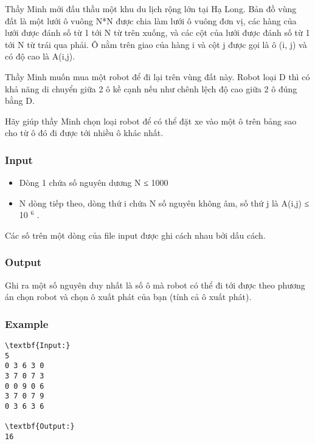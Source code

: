 



   Thầy Minh mới đấu thầu một khu du lịch rộng lớn tại Hạ Long. Bản đồ vùng đất là một lưới ô vuông N*N được chia làm lưới ô vuông đơn vị, các hàng của lưới được đánh số từ 1 tới N từ trên xuống, và các cột của lưới được đánh số từ 1 tới N từ trái qua phải. Ô nằm trên giao của hàng i và cột j được gọi là ô (i, j) và có độ cao là A(i,j).  

   Thầy Minh muốn mua một robot để đi lại trên vùng đất này. Robot loại D thì có khả năng di chuyển giữa 2 ô kề cạnh nếu như chênh lệch độ cao giữa 2 ô đúng bằng D.  

   Hãy giúp thầy Minh chọn loại robot để có thể đặt xe vào một ô trên bảng sao cho từ ô đó đi được tới nhiều ô khác nhất.  

\subsubsection{   Input  }
\begin{itemize}
	\item     Dòng 1 chứa số nguyên dương N ≤ 1000   
	\item     N dòng tiếp theo, dòng thứ i chứa N số nguyên không âm, số thứ j là A(i,j)         ≤ 10     $^      6     $     .    
\end{itemize}

   Các số trên một dòng của file input được ghi cách nhau bởi dấu cách.  

\subsubsection{   Output  }

   Ghi ra một số nguyên duy nhất là số ô mà robot có thể đi tới được theo phương án chọn robot và chọn ô xuất phát của bạn (tính cả ô xuất phát).  

\subsubsection{   Example  }
\begin{verbatim}
\textbf{Input:}
5
0 3 6 3 0 
3 7 0 7 3 
0 0 9 0 6 
3 7 0 7 9 
0 3 6 3 6

\textbf{Output:}
16
\end{verbatim}